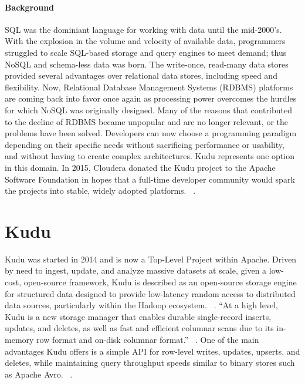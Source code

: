 \paragraph{Background}
SQL was the dominiant language for working with data until the mid-2000's. With the explosion in the volume and velocity of available data, programmers struggled to scale SQL-based storage and query engines to meet demand; thus NoSQL and schema-less data was born. The write-once, read-many data stores provided several advantages over relational data stores, including speed and flexibility. Now, Relational Database Management Systems (RDBMS) platforms are coming back into favor once again as processing power overcomes the hurdles for which NoSQL was originally designed. Many of the reasons that contributed to the decline of RDBMS became unpopular and are no longer relevant, or the problems have been solved. Developers can now choose a programming paradigm depending on their specific needs without sacrificing performance or usability, and without having to create complex architectures.  Kudu represents one option in this domain. In 2015, Cloudera donated the Kudu project to the Apache Software Foundation in hopes that a full-time developer community would spark the projects into stable, widely adopted platforms. ~\cite{hid-sp18-407-cloudera-donates}.

\section{Kudu}
Kudu was started in 2014 and is now a Top-Level Project within Apache. Driven by need to ingest, update, and analyze massive datasets at scale, given a low-cost, open-source framework, Kudu is described as an open-source storage engine for structured data designed to provide low-latency random access to distributed data sources, particularly within the Hadoop ecosystem. ~\cite{hid-sp18-407-kudu-intro}. ``At a high level, Kudu is a new storage manager that enables durable single-record inserts, updates, and deletes, as well as fast and efficient columnar scans due to its in-memory row format and on-disk columnar format.'' ~\cite{hid-sp18-407-kudu-impala-integration}. One of the main advantages Kudu offers is a simple API for row-level writes, updates, upserts, and deletes, while maintaining query throughput speeds similar to binary stores such as Apache Avro. ~\cite{hid-sp18-407-kudu-intro}.

